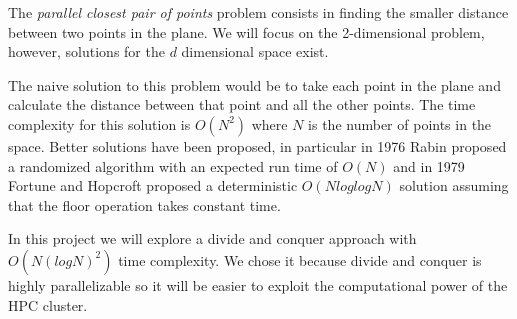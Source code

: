 The \textit{parallel closest pair of points} problem consists 
in finding the smaller distance between two points in the plane.
We will focus on the 2-dimensional problem, however, solutions for 
the $d$ dimensional space exist.

The naive solution to this problem would be to take each point 
in the plane and calculate the distance between that point and all 
the other points. The time complexity for this solution is $O(N^2)$
where $N$ is the number of points in the space.
Better solutions have been proposed, in particular in 1976 
Rabin proposed a randomized algorithm with an expected run time 
of $O(N)$ and in 1979 Fortune and Hopcroft proposed a 
deterministic $O(N log log N)$ solution \cite{Fortune_Hopcroft}
assuming that the floor operation takes constant time.

In this project we will explore a divide and conquer approach 
with $O(N(logN)^2)$ time complexity. We chose it because
divide and conquer is highly parallelizable so it will be easier
to exploit the computational power of the HPC cluster.
